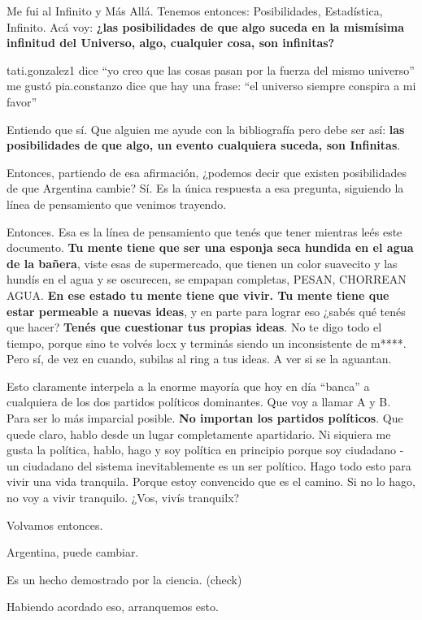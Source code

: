 \documentclass[
]{book}
\begin{document}
Me fui al Infinito y Más Allá. Tenemos entonces: Posibilidades, Estadística, Infinito. Acá voy: \textbf{¿las posibilidades de que algo suceda en la mismísima infinitud del Universo, algo, cualquier cosa, son infinitas?}

tati.gonzalez1 dice ``yo creo que las cosas pasan por la fuerza del mismo universo'' me gustó
pia.constanzo dice que hay una frase: ``el universo siempre conspira a mi favor''

Entiendo que sí. Que alguien me ayude con la bibliografía pero debe ser así: \textbf{las posibilidades de que algo, un evento cualquiera suceda, son Infinitas}.

Entonces, partiendo de esa afirmación, ¿podemos decir que existen posibilidades de que Argentina cambie? Sí. Es la única respuesta a esa pregunta, siguiendo la línea de pensamiento que venimos trayendo.

Entonces. Esa es la línea de pensamiento que tenés que tener mientras leés este documento. \textbf{Tu mente tiene que ser una esponja seca hundida en el agua de la bañera}, viste esas de supermercado, que tienen un color suavecito y las hundís en el agua y se oscurecen, se empapan completas, PESAN, CHORREAN AGUA. \textbf{En ese estado tu mente tiene que vivir. Tu mente tiene que estar permeable a nuevas ideas}, y en parte para lograr eso ¿sabés qué tenés que hacer? \textbf{Tenés que cuestionar tus propias ideas}. No te digo todo el tiempo, porque sino te volvés locx y terminás siendo un inconsistente de m****. Pero sí, de vez en cuando, subilas al ring a tus ideas. A ver si se la aguantan.

Esto claramente interpela a la enorme mayoría que hoy en día ``banca'' a cualquiera de los dos partidos políticos dominantes. Que voy a llamar A y B. Para ser lo más imparcial posible. \textbf{No importan los partidos políticos}. Que quede claro, hablo desde un lugar completamente apartidario. Ni siquiera me gusta la política, hablo, hago y soy política en principio porque soy ciudadano - un ciudadano del sistema inevitablemente es un ser político. Hago todo esto para vivir una vida tranquila. Porque estoy convencido que es el camino. Si no lo hago, no voy a vivir tranquilo. ¿Vos, vivís tranquilx?

Volvamos entonces.

Argentina, puede cambiar.

Es un hecho demostrado por la ciencia. (check)

Habiendo acordado eso, arranquemos esto.
\end{document}
